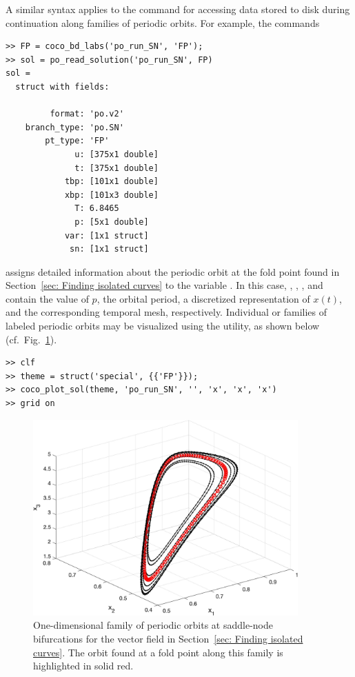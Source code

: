 A similar syntax applies to the command  for accessing data stored to disk during continuation along families of periodic orbits. For example, the commands
\begin{lstlisting}[language=coco-highlight,frame=lines]
>> FP = coco_bd_labs('po_run_SN', 'FP');
>> sol = po_read_solution('po_run_SN', FP)
sol = 
  struct with fields:

         format: 'po.v2'
    branch_type: 'po.SN'
        pt_type: 'FP'
              u: [375x1 double]
              t: [375x1 double]
            tbp: [101x1 double]
            xbp: [101x3 double]
              T: 6.8465
              p: [5x1 double]
            var: [1x1 struct]
             sn: [1x1 struct]
\end{lstlisting}
assigns detailed information about the periodic orbit at the fold point found in Section~\ref{sec: Finding isolated curves} to the variable . In this case,  , , , and  contain the value of $p$, the orbital period, a discretized representation of $x(t)$, and the corresponding temporal mesh, respectively. Individual or families of labeled periodic orbits may be visualized using the  utility, as shown below (cf.\ Fig.~\ref{fig: Section5_2_1}).
\begin{lstlisting}[language=coco-highlight,frame=lines]
>> clf
>> theme = struct('special', {{'FP'}});
>> coco_plot_sol(theme, 'po_run_SN', '', 'x', 'x', 'x')
>> grid on
\end{lstlisting}
\begin{figure}[h]
\centering
\includegraphics[width=4in]{Figures/Section5_2_1.jpg}
\caption{One-dimensional family of periodic orbits at saddle-node bifurcations for the vector field in Section~\ref{sec: Finding isolated curves}. The orbit found at a fold point along this family is highlighted in solid red.}
\label{fig: Section5_2_1}
\end{figure}


